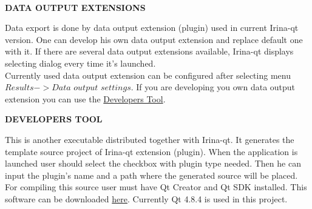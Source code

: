 \documentclass[a4paper]{article}
\begin{document}
\hypertarget{dataexport}{\\}
\begin{center}\textbf{DATA OUTPUT EXTENSIONS}\end{center}
{
Data export is done by data output extension (plugin) used in current Irina-qt version.
One can develop his own data output extension and replace default one with it.
If there are several data output extensions available, Irina-qt displays selecting dialog every time it's launched.
\\
Currently used data output extension can be configured after selecting menu $Results->Data$ $output$ $settings$.
If you are developing you own data output extension you can use the \hyperlink{devtool}{Developers Tool}.
}
\hypertarget{devtool}{\\}
\begin{center}\textbf{DEVELOPERS TOOL}\end{center}
{
This is another executable distributed together with Irina-qt.
It generates the template source project of Irina-qt extension (plugin).
When the application is launched user should select the checkbox with plugin type needed.
Then he can input the plugin's name and a path where the generated source will be placed.
For compiling this source user must have Qt Creator and Qt SDK installed.
This software can be downloaded \href{http://qt-project.org/downloads}{here}.
Currently Qt 4.8.4 is used in this project.
}
\end{document}
